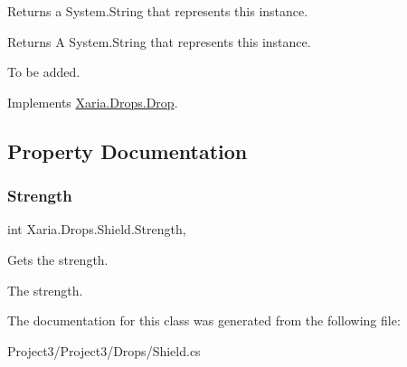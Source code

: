 Returns a System.\+String that represents this instance. 

\begin{DoxyReturn}{Returns}
A System.\+String that represents this instance. 
\end{DoxyReturn}


To be added. 

Implements \hyperlink{classXaria_1_1Drops_1_1Drop_abe25441e5c3fe5b2199352f24bfafa4b}{Xaria.\+Drops.\+Drop}.



\subsection{Property Documentation}
\mbox{\label{classXaria_1_1Drops_1_1Shield_aa27eea9b5a8f9352752e052869d3f3d2}} 
\subsubsection{\texorpdfstring{Strength}{Strength}}
{\footnotesize\ttfamily int Xaria.\+Drops.\+Shield.\+Strength\hspace{0.3cm}{\ttfamily [get]}, {}}



Gets the strength. 

The strength. 

The documentation for this class was generated from the following file\+:\begin{DoxyCompactItemize}
\item 
Project3/\+Project3/\+Drops/Shield.\+cs\end{DoxyCompactItemize}
